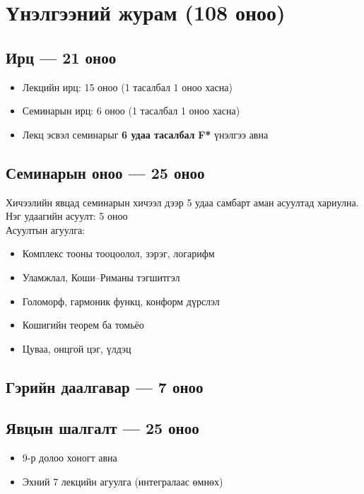 \newpage
\section*{Үнэлгээний журам (108 оноо)}

\subsection*{Ирц — 21 оноо}
\begin{itemize}
\item Лекцийн ирц: 15 оноо (1 тасалбал 1 оноо хасна)
\item Семинарын ирц: 6 оноо (1 тасалбал 1 оноо хасна)
\item Лекц эсвэл семинарыг \textbf{6 удаа тасалбал} \textbf{F*} үнэлгээ авна
\end{itemize}

\subsection*{Семинарын оноо  — 25 оноо}
Хичээлийн явцад семинарын хичээл дээр 5 удаа самбарт аман асуултад хариулна.\\
Нэг удаагийн асуулт: 5 оноо\\ Асуултын агуулга:
\begin{itemize}
\item Комплекс тооны тооцоолол, зэрэг, логарифм
\item Уламжлал, Коши--Риманы тэгшитгэл
\item Голоморф, гармоник функц, конформ дүрслэл
\item Кошигийн теорем ба томьёо
\item Цуваа, онцгой цэг, үлдэц
\end{itemize}

\subsection*{Гэрийн даалгавар — 7 оноо}

\subsection*{Явцын шалгалт — 25 оноо}
\begin{itemize}
\item 9-р долоо хоногт авна
\item Эхний 7 лекцийн агуулга (интегралаас өмнөх)
\end{itemize}

